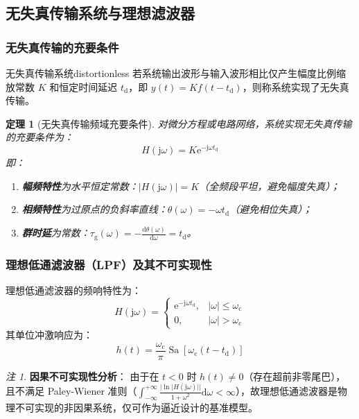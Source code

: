 \documentclass[11pt,a4paper,fontset=fandol]{ctexart}
\newtheorem{theorem}{定理}[section]
\theoremstyle{remark}
\newtheorem{remark}{注}[section]
\begin{document}
\subsection{无失真传输系统与理想滤波器}

\subsubsection{无失真传输的充要条件}
\begin{definition}{无失真传输系统}{distortionless}
若系统输出波形与输入波形相比仅产生幅度比例缩放常数 $K$ 和恒定时间延迟 $t_{\mathrm{d}}$，即 $y(t) = K f(t - t_{\mathrm{d}})$，则称系统实现了无失真传输。
\end{definition}

\begin{theorem}[无失真传输频域充要条件]
对微分方程或电路网络，系统实现无失真传输的充要条件为：
\begin{equation}
    H(\mathrm{j}\omega) = K \mathrm{e}^{-\mathrm{j}\omega t_{\mathrm{d}}}
\end{equation}
即：
\begin{enumerate}
    \item \textbf{幅频特性}为水平恒定常数：$|H(\mathrm{j}\omega)| = K$（全频段平坦，避免幅度失真）；
    \item \textbf{相频特性}为过原点的负斜率直线：$\theta(\omega) = -\omega t_{\mathrm{d}}$（避免相位失真）；
    \item \textbf{群时延}为常数：$\tau_{\mathrm{g}}(\omega) = -\frac{\mathrm{d}\theta(\omega)}{\mathrm{d}\omega} = t_{\mathrm{d}}$。
\end{enumerate}
\end{theorem}

\subsubsection{理想低通滤波器（LPF）及其不可实现性}
理想低通滤波器的频响特性为：
\begin{equation}
    H(\mathrm{j}\omega) = \begin{cases} \mathrm{e}^{-\mathrm{j}\omega t_{\mathrm{d}}}, & |\omega| \le \omega_{\mathrm{c}} \\ 0, & |\omega| > \omega_{\mathrm{c}} \end{cases}
\end{equation}
其单位冲激响应为：
\begin{equation}
    h(t) = \frac{\omega_{\mathrm{c}}}{\pi} \operatorname{Sa}[\omega_{\mathrm{c}}(t - t_{\mathrm{d}})]
\end{equation}
\begin{remark}
\textbf{因果不可实现性分析}：
由于在 $t < 0$ 时 $h(t) \neq 0$（存在超前非零尾巴），且不满足 Paley-Wiener 准则（$\int_{-\infty}^{+\infty} \frac{|\ln |H(\mathrm{j}\omega)||}{1 + \omega^2}\mathrm{d}\omega < \infty$），故理想低通滤波器是物理不可实现的非因果系统，仅可作为逼近设计的基准模型。
\end{remark}
\end{document}
